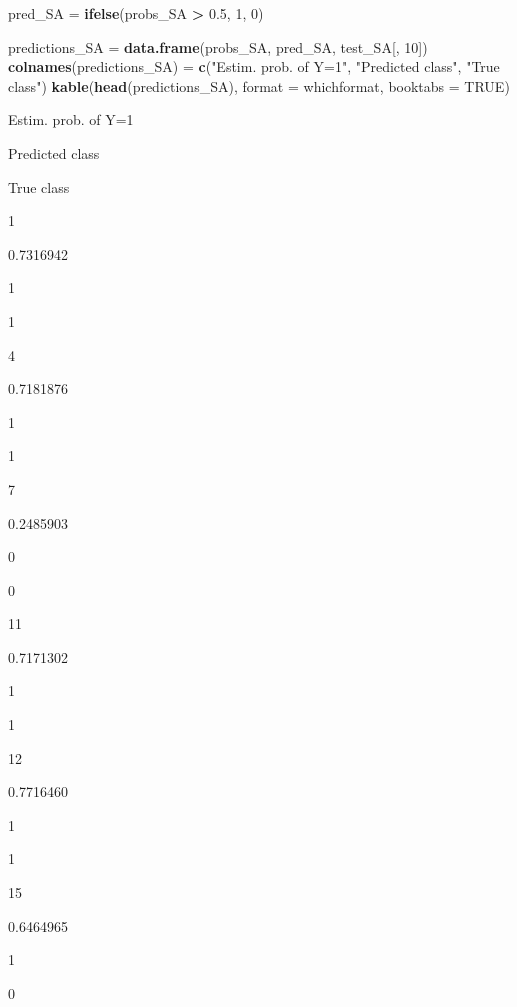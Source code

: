 \documentclass[10pt,ignorenonframetext,]{beamer}
\newenvironment{Shaded}{\begin{snugshade}}{\end{snugshade}}
\newcommand{\KeywordTok}[1]{\textcolor[rgb]{0.13,0.29,0.53}{\textbf{#1}}}
\newcommand{\DataTypeTok}[1]{\textcolor[rgb]{0.13,0.29,0.53}{#1}}
\newcommand{\DecValTok}[1]{\textcolor[rgb]{0.00,0.00,0.81}{#1}}
\newcommand{\FloatTok}[1]{\textcolor[rgb]{0.00,0.00,0.81}{#1}}
\newcommand{\StringTok}[1]{\textcolor[rgb]{0.31,0.60,0.02}{#1}}
\newcommand{\OtherTok}[1]{\textcolor[rgb]{0.56,0.35,0.01}{#1}}
\newcommand{\OperatorTok}[1]{\textcolor[rgb]{0.81,0.36,0.00}{\textbf{#1}}}
\newcommand{\NormalTok}[1]{#1}
\begin{document}
\begin{frame}[fragile]

\begin{Shaded}
\begin{Highlighting}[]
\NormalTok{pred_SA =}\StringTok{ }\KeywordTok{ifelse}\NormalTok{(probs_SA }\OperatorTok{>}\StringTok{ }\FloatTok{0.5}\NormalTok{, }\DecValTok{1}\NormalTok{, }\DecValTok{0}\NormalTok{)}

\NormalTok{predictions_SA =}\StringTok{ }\KeywordTok{data.frame}\NormalTok{(probs_SA, pred_SA, test_SA[, }\DecValTok{10}\NormalTok{])}
\KeywordTok{colnames}\NormalTok{(predictions_SA) =}\StringTok{ }\KeywordTok{c}\NormalTok{(}\StringTok{"Estim. prob. of Y=1"}\NormalTok{, }\StringTok{"Predicted class"}\NormalTok{, }
    \StringTok{"True class"}\NormalTok{)}
\KeywordTok{kable}\NormalTok{(}\KeywordTok{head}\NormalTok{(predictions_SA), }\DataTypeTok{format =}\NormalTok{ whichformat, }\DataTypeTok{booktabs =} \OtherTok{TRUE}\NormalTok{)}
\end{Highlighting}
\end{Shaded}

Estim. prob. of Y=1

Predicted class

True class

1

0.7316942

1

1

4

0.7181876

1

1

7

0.2485903

0

0

11

0.7171302

1

1

12

0.7716460

1

1

15

0.6464965

1

0

\end{frame}
\end{document}
